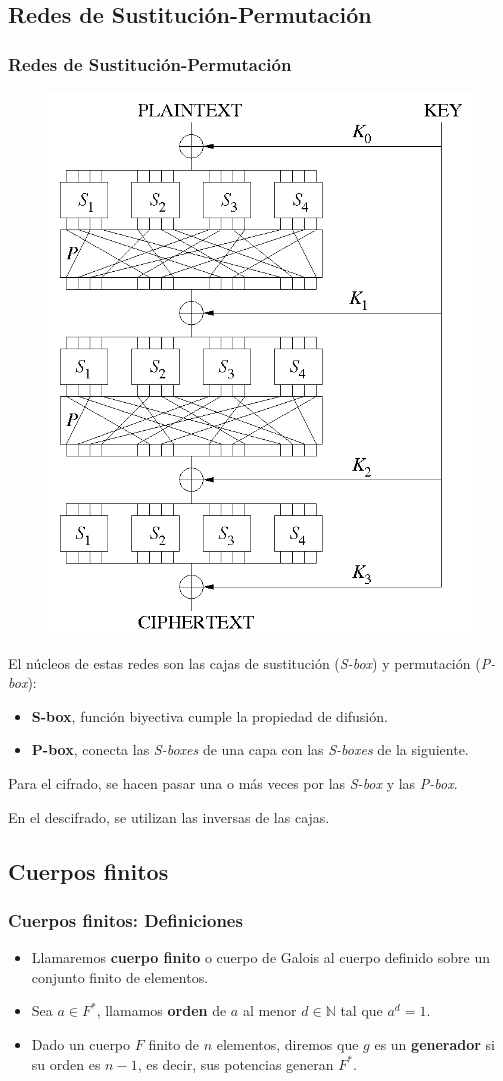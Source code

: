 \documentclass{beamer}
\begin{document}
	\subsection{Redes de Sustitución-Permutación}
	\begin{frame}
	\frametitle{Redes de Sustitución-Permutación}
	\begin{figure} %
		\centering
		\includegraphics[height=0.4\textwidth]{./Images/SubstitutionPermutationNetwork.png}
	\end{figure}
	
	El núcleos de estas redes son las cajas de sustitución (\textit{S-box}) y permutación (\textit{P-box}):
	
	\begin{itemize}
		\item \textbf{S-box}, función biyectiva cumple la propiedad de difusión.
	
		\item \textbf{P-box}, conecta las \textit{S-boxes} de una capa con las \textit{S-boxes} de la siguiente.
	\end{itemize}
	
	Para el cifrado, se hacen pasar una o más veces por las \textit{S-box} y las \textit{P-box}.
	
	En el descifrado, se utilizan las inversas de las cajas.
	\end{frame}

	\subsection{Cuerpos finitos}
	\begin{frame}
	\frametitle{Cuerpos finitos: Definiciones}
	\begin{itemize}
		\item Llamaremos \textbf{cuerpo finito} o cuerpo de Galois al cuerpo definido sobre un conjunto finito de elementos.

		\item Sea $a \in F^*$, llamamos \textbf{orden} de $a$ al menor $d \in \mathbb{N}$ tal que $a^d = 1$.
		
		\item Dado un cuerpo $F$ finito de $n$ elementos, diremos que $g$ es un \textbf{generador} si su orden es $n-1$, es decir, sus potencias generan $F^*$.
	\end{itemize}
	\end{frame}
\end{document}
